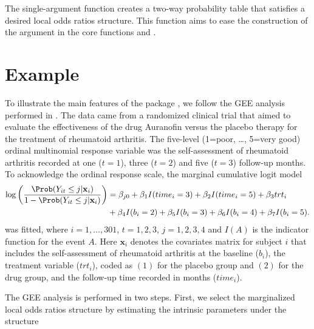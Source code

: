 \documentclass[
]{jss}
\begin{document}
The single-argument function  creates a two-way
probability table that satisfies a desired local odds ratios structure.
This function aims to ease the construction of the 
argument in the core functions  and .

\hypertarget{Example}{%
\section{Example}\label{Example}}

To illustrate the main features of the package , we follow
the GEE analysis performed in \citet{Touloumis2012}. The data came from
a randomized clinical trial \citep{Lipsitz1994} that aimed to evaluate
the effectiveness of the drug Auranofin versus the placebo therapy for
the treatment of rheumatoid arthritis. The five-level (1=poor, \ldots,
5=very good) ordinal multinomial response variable was the
self-assessment of rheumatoid arthritis recorded at one (\(t=1\)), three
(\(t=2\)) and five (\(t=3\)) follow-up months. To acknowledge the
ordinal response scale, the marginal cumulative logit model
\begin{align}
\log \left(\frac{\Prob(Y_{it}\leq j|\mathbf x_i)}{1-\Prob(Y_{it}\leq j|\mathbf x_i)}\right)&=\beta_{j0}+\beta_1 I(time_i=3)+\beta_2 I(time_i=5) +\beta_3 trt_i   \nonumber\\ 
                                                     &+\beta_4 I(b_i=2)+\beta_5 I(b_i=3)+\beta_6 I(b_i=4)+\beta_7 I(b_i=5).
\label{MarginalModelData}
\end{align} was fitted, where \(i=1,\ldots,301\), \(t=1,2,3\),
\(j=1,2,3,4\) and \(I(A)\) is the indicator function for the event
\(A\). Here \(\mathbf x_i\) denotes the covariates matrix for subject
\(i\) that includes the self-assessment of rheumatoid arthritis at the
baseline (\(b_i\)), the treatment variable (\(trt_i\)), coded as \((1)\)
for the placebo group and \((2)\) for the drug group, and the follow-up
time recorded in months (\(time_i\)).

The GEE analysis is performed in two steps. First, we select the
marginalized local odds ratios structure by estimating the intrinsic
parameters under the  structure
\end{document}
